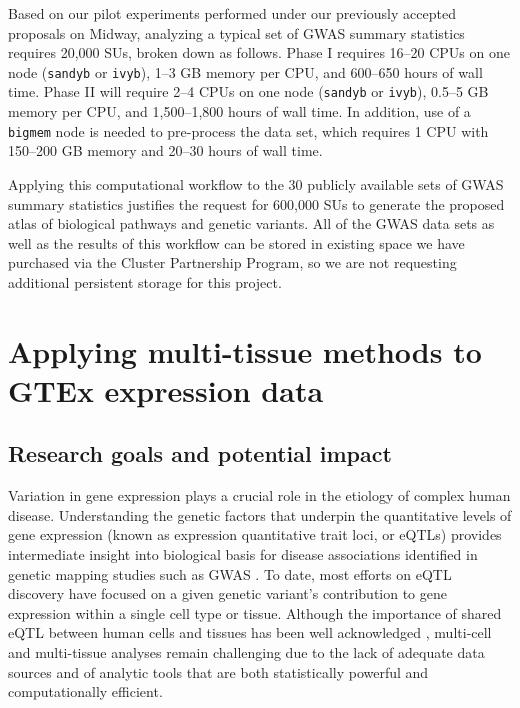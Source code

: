 \documentclass[10pt]{article}
\begin{document}
Based on our pilot experiments performed under our previously accepted
proposals on Midway, analyzing a typical set of GWAS summary
statistics requires 20,000 SUs, broken down as follows. Phase I
requires 16--20 CPUs on one node (\texttt{sandyb} or \texttt{ivyb}),
1--3 GB memory per CPU, and 600--650 hours of wall time. Phase II will
require 2--4 CPUs on one node (\texttt{sandyb} or \texttt{ivyb}),
0.5--5 GB memory per CPU, and 1,500--1,800 hours of wall time. In
addition, use of a \texttt{bigmem} node is needed to pre-process the
data set, which requires 1 CPU with 150--200 GB memory and 20--30
hours of wall time.

Applying this computational workflow to the 30 publicly available sets
of GWAS summary statistics justifies the request for 600,000 SUs to
generate the proposed atlas of biological pathways and genetic
variants. All of the GWAS data sets as well as the results of this
workflow can be stored in existing space we have purchased via the
Cluster Partnership Program, so we are not requesting additional
persistent storage for this project.

\section*{Applying multi-tissue methods to GTEx expression data}

\subsection*{Research goals and potential
impact}\label{gao-research-goals-and-the-potential-impact}

Variation in gene expression plays a crucial role in the etiology of
complex human disease.  Understanding the genetic factors that
underpin the quantitative levels of gene expression (known as
expression quantitative trait loci, or eQTLs) provides intermediate
insight into biological basis for disease associations identified in
genetic mapping studies such as GWAS \cite{albert.kruglyak:role}.  To
date, most efforts on eQTL discovery have focused on a given genetic
variant's contribution to gene expression within a single cell type or
tissue.  Although the importance of shared eQTL between human cells
and tissues has been well acknowledged \cite{dimas.ea:common},
multi-cell and multi-tissue analyses remain challenging due to the
lack of adequate data sources and of analytic tools that are both
statistically powerful and computationally efficient.
\end{document}
